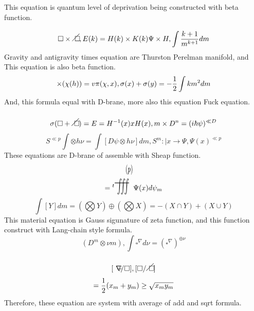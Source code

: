 \documentclass{jsarticle}
\begin{document}
This equation is quantum level of deprivation being constructed with beta
function.
$$ \square \times \alearletter, E(k) = H(k) \times K(k) 
 \Psi \times H, \int {{k + 1} \over {m^{k+1}}}dm $$
Gravity and antigravity times equation are Thurston Perelman manifold,
and This equation is also beta function.
$$ \times(\chi(h))= v\pi(\chi,x), \sigma(x) + \sigma(y) = -{1 \over 2}
\int km^2 dm $$
And, this formula equal with D-brane, more also this equation Fuck equation.
$$ \sigma(\square + \alearletter) = E = H^{-1}(x)xH(x), 
{m}\times D^{n} = (i\hbar \psi)^{\ll D} $$
$$ S^{\ll p} \int \otimes h \nu = \int [D \psi \otimes h \nu]dm, 
 S^{m}:| x \to \Psi, \Psi(x)^{\ll p} $$ 
 These equations are D-brane of assemble with Sheap function.
$$= {}^{t}\scalebox{1.0}[2]{\text{$\variiint^{(p)}$}}\Psi (x) d \psi_m $$
$$ \int[Y]dm = (\bigotimes Y) \oplus (\bigotimes X) 
= - (X \cap Y) + (X \cup Y) $$
This material equation is Gauss sigunature of zeta function,
and this function construct with Lang-chain style formula.
$$ (D^{m} \otimes \nu m), \int \square^{\nabla}d \nu   
 = (\square^{\nabla})^{\oplus \nu} $$
$$ [{\secproduct} / {\square}], 
 [{\square} / {\alearletter}] $$
$$= {1 \over 2}(x_m + y_m) \ge \sqrt{x_m y_m} $$
Therefore, these equation are system with average of add and sqrt formula.
\end{document}
